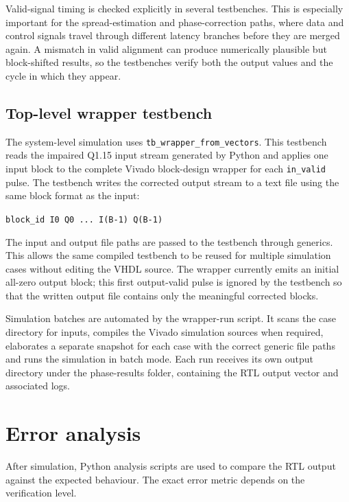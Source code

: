 Valid-signal timing is checked explicitly in several testbenches. This is especially important for the spread-estimation and phase-correction paths, where data and control signals travel through different latency branches before they are merged again. A mismatch in valid alignment can produce numerically plausible but block-shifted results, so the testbenches verify both the output values and the cycle in which they appear.

\subsection{Top-level wrapper testbench}

The system-level simulation uses \texttt{tb\_wrapper\_from\_vectors}. This testbench reads the impaired Q1.15 input stream generated by Python and applies one input block to the complete Vivado block-design wrapper for each \texttt{in\_valid} pulse. The testbench writes the corrected output stream to a text file using the same block format as the input:

\begin{center}
\texttt{block\_id I0 Q0 ... I(B-1) Q(B-1)}
\end{center}

The input and output file paths are passed to the testbench through generics. This allows the same compiled testbench to be reused for multiple simulation cases without editing the \ac{VHDL} source. The wrapper currently emits an initial all-zero output block; this first output-valid pulse is ignored by the testbench so that the written output file contains only the meaningful corrected blocks.

Simulation batches are automated by the wrapper-run script. It scans the case directory for inputs, compiles the Vivado simulation sources when required, elaborates a separate snapshot for each case with the correct generic file paths and runs the simulation in batch mode. Each run receives its own output directory under the phase-results folder, containing the RTL output vector and associated logs.

\section{Error analysis}

After simulation, Python analysis scripts are used to compare the RTL output against the expected behaviour. The exact error metric depends on the verification level.


